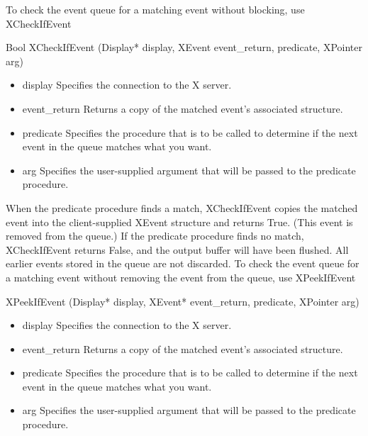 \documentclass{report}
\begin{document}
\begin{itemize}
            \bigbreak \noindent 
            To check the event queue for a matching event without blocking, use XCheckIfEvent
            \bigbreak \noindent 
            \begin{cppcode}
            Bool XCheckIfEvent (Display* display, XEvent event_return, predicate, XPointer arg)
            \end{cppcode}
            \begin{itemize}
                \item display Specifies the connection to the X server.
                \item event\_return Returns a copy of the matched event’s associated structure.
                \item predicate Specifies the procedure that is to be called to determine if the next event in the queue matches what you want.
                \item arg Specifies the user-supplied argument that will be passed to the predicate procedure.
            \end{itemize}
            When the predicate procedure finds a match, XCheckIfEvent copies the matched event into the client-supplied XEvent structure and returns True. (This event is removed from the queue.) If the predicate procedure finds no match, XCheckIfEvent returns False, and the output buffer will have been flushed. All earlier events stored in the queue are not discarded.
            \bigbreak \noindent 
            To check the event queue for a matching event without removing the event from the queue, use XPeekIfEvent
            \bigbreak \noindent 
            \begin{cppcode}
            XPeekIfEvent (Display* display, XEvent* event_return, predicate, XPointer arg)
            \end{cppcode}
            \begin{itemize}
                \item display Specifies the connection to the X server.
                \item event\_return Returns a copy of the matched event’s associated structure.
                \item predicate Specifies the procedure that is to be called to determine if the next event in the queue matches what you want.
                \item arg Specifies the user-supplied argument that will be passed to the predicate procedure.
            \end{itemize}

\end{itemize}
\end{document}
